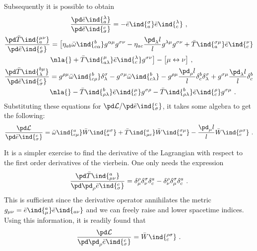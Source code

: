 \documentclass[11pt]{article}
\begin{document}
Subsequently it is possible to obtain
\begin{gather*}
	\frac{\pd \bar{e}\ind{_a^\lambda}}{\pd \bar{e}\ind{^c_\sigma}} 
	= - \bar{e}\ind{_a^\sigma} \bar{e}\ind{_c^\lambda}~,
	\\
	\begin{split}
	\frac{\pd \bar{T}\ind{_a^{\mu\nu}}}{\pd \bar{e}\ind{^c_\sigma}} 
	&= \big[ \eta_{ab} \bar{\omega}\ind{^b_{c\alpha}} g^{\alpha\mu} 
	g^{\sigma\nu} - \eta_{ac} \frac{\pd_\lambda l}{l} 
	g^{\lambda\mu} g^{\sigma\nu} + \bar{T}\ind{_a^{\sigma\mu}} 
	\bar{e}\ind{_c^\nu} \\
	&\nla{}+ \bar{T}\ind{_{a\lambda}^\mu} \bar{e}\ind{_c^\lambda} 
	g^{\sigma\nu} \big] - \big[ \mu \leftrightarrow \nu \big]~,
	\end{split}
	\\
	\begin{split}
	\frac{\pd \bar{T}\ind{^{b\mu}_\lambda}}{\pd 
		\bar{e}\ind{^c_\sigma}}
	&= g^{\rho\mu} \bar{\omega}\ind{^b_{c\rho}} 
	\delta^\sigma_\lambda - g^{\sigma\mu} 
	\bar{\omega}\ind{^b_{c\lambda}} - g^{\rho\mu} \frac{\pd_\rho 
		l}{l} \delta^b_c \delta^\sigma_\lambda + g^{\sigma\mu} 
	\frac{\pd_\lambda l}{l} \delta^b_c \\
	&\nla{}- \bar{T}\ind{^b_{\rho\lambda}} \bar{e}\ind{_c^\mu} 
	g^{\sigma\rho} - \bar{T}\ind{^b_{\rho\lambda}} 
	\bar{e}\ind{_c^\rho} g^{\sigma\mu}~.
	\end{split}
\end{gather*}
Substituting these equations for $\pd \mathcal{L}/\pd 
\bar{e}\ind{^c_\sigma}$, it takes some algebra to get the 
following:
\begin{equation}
	\frac{\pd \mathcal{L}}{\pd \bar{e}\ind{^c_\sigma}}
	= \bar{\omega}\ind{^a_{c\mu}} \bar{W}\ind{_a^{\mu\sigma}} + 
	\bar{T}\ind{^a_{\mu c}} \bar{W}\ind{_a^{\sigma\mu}} - 
	\frac{\pd_\mu l}{l} \bar{W}\ind{_c^{\mu\sigma}}~.
\end{equation}

It is a simpler exercise to find the derivative of the Lagrangian 
with respect to the first order derivatives of the vierbein. One 
only needs the expression
\begin{displaymath}
	\frac{\pd \bar{T}\ind{^a_{\mu\nu}}}{\pd\pd_\rho 
		\bar{e}\ind{^c_\sigma}} = \delta^\rho_\mu \delta^\sigma_\nu 
	\delta^a_c - \delta^\rho_\nu \delta^\sigma_\mu \delta^a_c~.
\end{displaymath}
This is sufficient since the derivative operator annihilates the 
metric $g_{\mu\nu} = \bar{e}\ind{^a_\mu}\bar{e}\ind{_{a\nu}}$ and 
we can freely raise and lower spacetime indices. Using this 
information, it is readily found that
\begin{equation}
	\frac{\pd \mathcal{L}}{\pd\pd_\rho \bar{e}\ind{^c_\sigma}} = 
	\bar{W}\ind{_c^{\rho\sigma}}~.
\end{equation}


\newpage


\end{document}
